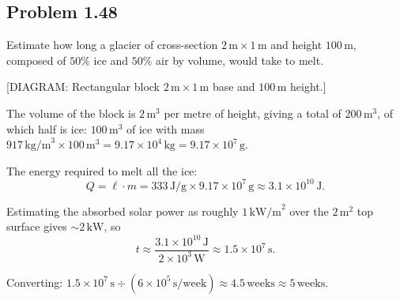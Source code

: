 \subsection*{Problem 1.48}

Estimate how long a glacier of cross-section $2\,\text{m}\times 1\,\text{m}$ and height $100\,\text{m}$, composed of $50\%$ ice and $50\%$ air by volume, would take to melt.

\begin{center}[DIAGRAM: Rectangular block $2\,\text{m} \times 1\,\text{m}$ base and $100\,\text{m}$ height.]\end{center}

The volume of the block is $2\,\text{m}^3$ per metre of height, giving a total of $200\,\text{m}^3$, of which half is ice: $100\,\text{m}^3$ of ice with mass $917\,\text{kg/m}^3 \times 100\,\text{m}^3 = 9.17 \times 10^4\,\text{kg} = 9.17 \times 10^7\,\text{g}$.

The energy required to melt all the ice:
\[
    Q = \ell \cdot m = 333\,\text{J/g} \times 9.17\times10^7\,\text{g} \approx 3.1\times10^{10}\,\text{J}.
\]

Estimating the absorbed solar power as roughly $1\,\text{kW/m}^2$ over the $2\,\text{m}^2$ top surface gives $\sim 2\,\text{kW}$, so
\[
    t \approx \frac{3.1\times10^{10}\,\text{J}}{2\times10^3\,\text{W}} \approx 1.5\times10^7\,\text{s}.
\]

Converting: $1.5\times10^7\,\text{s} \div (6\times10^5\,\text{s/week}) \approx 4.5\,\text{weeks} \approx 5\,\text{weeks}$.
